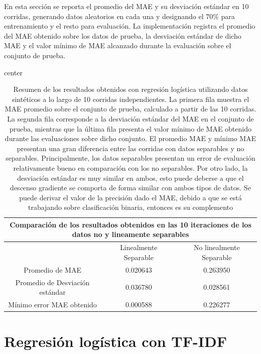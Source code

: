 \documentclass[12pt]{article}
\begin{document}
En esta sección se reporta el promedio del MAE y su desviación estándar en 10 corridas, generando datos aleatorios en cada una y designando el $70\%$ para entrenamiento y el resto para evaluación. La implementación registra el promedio del MAE obtenido sobre los datos de prueba, la desviación estándar de dicho MAE y el valor mínimo de MAE alcanzado durante la evaluación sobre el conjunto de prueba.

\begin{table}[H]
\centering
\label{tab:synthetic-results}
\begin{adjustbox}{center}
\begin{tabular}{ccc}
\multicolumn{3}{c}{Comparación de los resultados obtenidos en las 10 iteraciones de los datos no y lineamente separables} \\
\toprule
  & Linealmente Separable & No linealmente Separable \\
\midrule
Promedio de MAE & 0.020643 & 0.263950 \\
Promedio de Desviación estándar & 0.036780 & 0.028561 \\
Mínimo error MAE obtenido & 0.000588 & 0.226277 \\
\bottomrule
\end{tabular}
\end{adjustbox}
\caption{Resumen de los resultados obtenidos con regresión logística utilizando datos sintéticos a lo largo de 10 corridas independientes. La primera fila muestra el MAE promedio sobre el conjunto de prueba, calculado a partir de las 10 corridas. La segunda fila corresponde a la desviación estándar del MAE en el conjunto de prueba, mientras que la última fila presenta el valor mínimo de MAE obtenido durante las evaluaciones sobre dicho conjunto. El promedio MAE y mínimo MAE presentan una gran diferencia entre las corridas con datos separables y no separables. Principalmente, los datos separables presentan un error de evaluación relativamente bueno en comparación con los no separables. Por otro lado, la desviación estándar es muy similar en ambos, esto puede deberse a que el descenso gradiente se comporta de forma similar con ambos tipos de datos. Se puede derivar el valor de la precisión dado el MAE, debido a que se está trabajando sobre clasificación binaria, entonces es su complemento}
\end{table}

\section{Regresión logística con TF-IDF}
\end{document}
